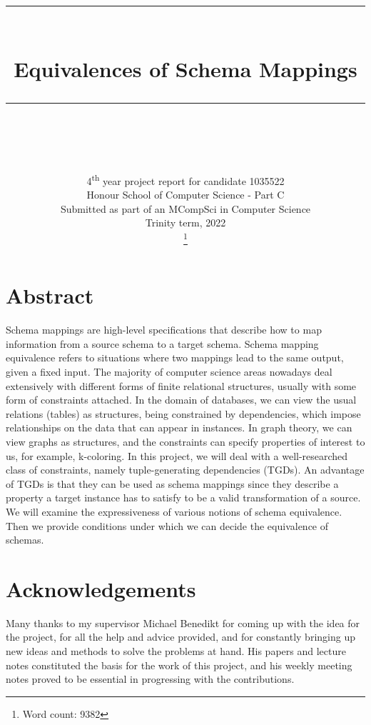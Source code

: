 \documentclass[11pt, a4paper, dvipsnames]{article}
\newcommand\blankpage{
    \null
    \thispagestyle{empty}%
    \addtocounter{page}{-1}%
    \newpage}
\newcommand{\HRule}[1]{\rule{\linewidth}{#1}}
\begin{document}
\title{ \normalsize \textsc{}
		\\ [2.0cm]
		\HRule{0.5pt} \\
		\LARGE \textbf{Equivalences of Schema Mappings}
		\HRule{0.5pt} \\ [0.5cm]
		\normalsize  \vspace*{3\baselineskip}}
\date{}
\author{
		4\textsuperscript{th} year project report for candidate 1035522\\
        Honour School of Computer Science - Part C\\
        Submitted as part of an MCompSci in Computer Science\\
		Trinity term, 2022\\ \footnote{Word count: 9382}	
		}

\maketitle
\thispagestyle{empty}
\newpage
\blankpage

\setcounter{page}{3}

\justifying

\section{Abstract}
Schema mappings are high-level specifications that describe how to map information from a source schema to a target schema. Schema mapping equivalence refers to situations where two mappings lead to the same output, given a fixed input. 
The majority of computer science areas nowadays deal extensively with different forms of finite relational structures, usually with some form of constraints attached. In the domain of databases, we can view the usual relations (tables) as structures, being constrained by dependencies, which impose relationships on the data that can appear in instances. In graph theory, we can view graphs as structures, and the constraints can specify properties of interest to us, for example, k-coloring. 
In this project, we will deal with a well-researched class of constraints, namely tuple-generating dependencies (TGDs).
An advantage of TGDs is that they can be used as schema mappings since they describe a property a target instance
has to satisfy to be a valid transformation of a source. We will examine the expressiveness of various notions of schema equivalence. Then we provide conditions under which we can decide the equivalence of schemas.

\section{Acknowledgements}
Many thanks to my supervisor Michael Benedikt for coming up with the idea for the project, for all the help and advice provided, and for constantly bringing up new ideas and methods to solve the problems at hand. His papers and lecture notes constituted the basis for the work of this project, and his weekly meeting notes proved to be essential in progressing with the contributions.
\end{document}
